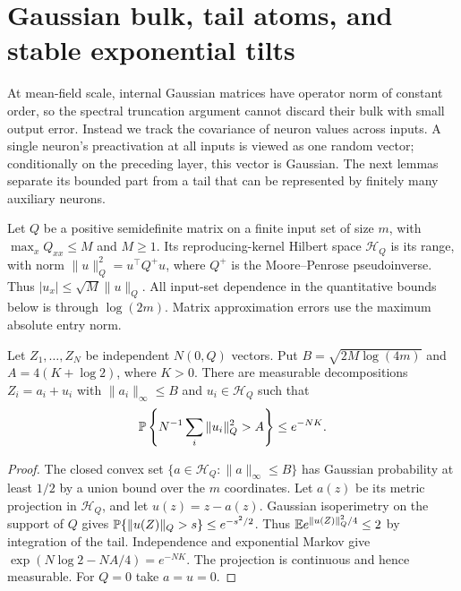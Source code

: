 \section{Gaussian bulk, tail atoms, and stable exponential tilts}
\label{sec:meanfield-preliminaries}
At mean-field scale, internal Gaussian matrices have operator norm of
constant order, so the spectral truncation argument cannot discard their
bulk with small output error. Instead we track the covariance of neuron
values across inputs. A single neuron's preactivation at all inputs is
viewed as one random vector; conditionally on the preceding layer, this
vector is Gaussian. The next lemmas separate its bounded part from a tail
that can be represented by finitely many auxiliary neurons.

Let $Q$ be a positive semidefinite matrix on a finite input set of size
$m$, with $\max_xQ_{xx}\le M$ and $M\ge1$. Its reproducing-kernel
Hilbert space $\mathcal H_Q$ is its range, with norm
$\|u\|_Q^2=u^\top Q^+u$, where $Q^+$ is the Moore--Penrose
pseudoinverse. Thus
$|u_x|\le\sqrt M\|u\|_Q$. All input-set dependence in the quantitative
bounds below is through $\log(2m)$. Matrix approximation errors use the
maximum absolute entry norm.

\begin{lemma}
\label{lem:bulk-recession}
Let $Z_1,\ldots,Z_N$ be independent $N(0,Q)$ vectors. Put
$B=\sqrt{2M\log(4m)}$ and $A=4(K+\log2)$, where $K>0$.
There are measurable decompositions $Z_i=a_i+u_i$ with
$\|a_i\|_\infty\le B$ and $u_i\in\mathcal H_Q$ such that
\[
 \mathbb P\left\{N^{-1}\sum_i\|u_i\|_Q^2>A\right\}\le e^{-NK}.
\]
\end{lemma}
\begin{proof}
The closed convex set $\{a\in\mathcal H_Q:\|a\|_\infty\le B\}$
has Gaussian probability at least $1/2$ by a union bound over the $m$
coordinates. Let $a(z)$ be its metric projection in $\mathcal H_Q$,
and let $u(z)=z-a(z)$. Gaussian isoperimetry on the support of $Q$ gives
$\mathbb P\{\|u(Z)\|_Q>s\}\le e^{-s^2/2}$.
Thus $\mathbb E e^{\|u(Z)\|_Q^2/4}\le2$ by integration of the tail.
Independence and exponential Markov give
$\exp(N\log2-NA/4)=e^{-NK}$. The projection is continuous and hence
measurable. For $Q=0$ take $a=u=0$.
\end{proof}

